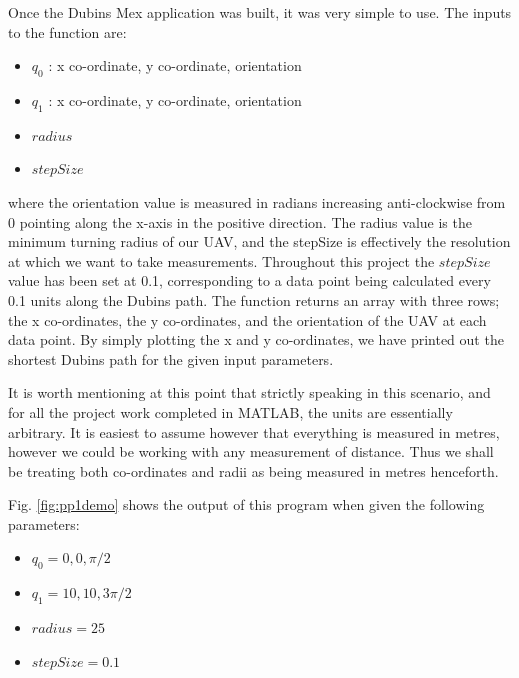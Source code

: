 Once the Dubins Mex application was built, it was very simple to use. The inputs to the function are:
\begin{itemize}
	\item $q_0$ : x co-ordinate, y co-ordinate, orientation
	\item $q_1$ : x co-ordinate, y co-ordinate, orientation
	\item $radius$
	\item $stepSize$
\end{itemize}

where the orientation value is measured in radians increasing anti-clockwise from 0 pointing along the x-axis in the positive direction. The radius value is the minimum turning radius of our UAV, and the stepSize is effectively the resolution at which we want to take measurements. Throughout this project the $stepSize$ value has been set at 0.1, corresponding to a data point being calculated every 0.1 units along the Dubins path. The function returns an array with three rows; the x co-ordinates, the y co-ordinates, and the orientation of the UAV at each data point. By simply plotting the x and y co-ordinates, we have printed out the shortest Dubins path for the given input parameters. 

It is worth mentioning at this point that strictly speaking in this scenario, and for all the project work completed in MATLAB, the units are essentially arbitrary. It is easiest to assume however that everything is measured in metres, however we could be working with any measurement of distance. Thus we shall be treating both co-ordinates and radii as being measured in metres henceforth.

Fig. \ref{fig:pp1demo} shows the output of this program when given the following parameters:

\begin{itemize}
	\item $q_0 = 0, 0, \pi/2$
	\item $q_1 = 10, 10, 3\pi/2$
	\item $radius = 25$
	\item $stepSize = 0.1$
\end{itemize}


